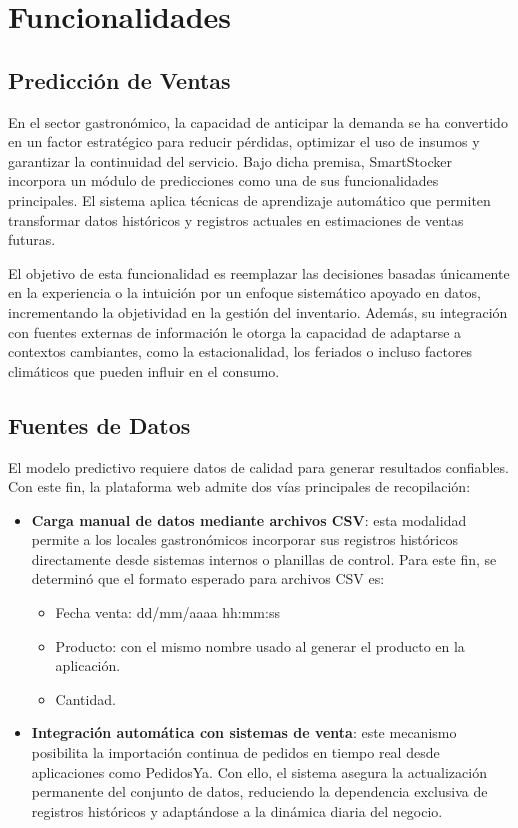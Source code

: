 \section{Funcionalidades}\label{sec:funcionalidades}

\subsection{Predicción de Ventas}\label{sec:prediccion-ventas}

En el sector gastronómico, la capacidad de anticipar la demanda se ha convertido en un factor estratégico para reducir pérdidas, optimizar el uso de insumos y garantizar la continuidad del servicio. Bajo dicha premisa, SmartStocker incorpora un módulo de predicciones como una de sus funcionalidades principales. El sistema aplica técnicas de aprendizaje automático que permiten transformar datos históricos y registros actuales en estimaciones de ventas futuras. 

El objetivo de esta funcionalidad es reemplazar las decisiones basadas únicamente en la experiencia o la intuición por un enfoque sistemático apoyado en datos, incrementando la objetividad en la gestión del inventario. Además, su integración con fuentes externas de información le otorga la capacidad de adaptarse a contextos cambiantes, como la estacionalidad, los feriados o incluso factores climáticos que pueden influir en el consumo.

\subsection{Fuentes de Datos}\label{sec:fuentes-datos}

El modelo predictivo requiere datos de calidad para generar resultados confiables. Con este fin, la plataforma web admite dos vías principales de recopilación:

\begin{itemize}
    \item \textbf{Carga manual de datos mediante archivos CSV}: esta modalidad permite a los locales gastronómicos incorporar sus registros históricos directamente desde sistemas internos o planillas de control. Para este fin, se determinó que el formato esperado para archivos CSV es:
    \begin{itemize}
        \item Fecha venta: dd/mm/aaaa hh:mm:ss
        \item Producto: con el mismo nombre usado al generar el producto en la aplicación.
        \item Cantidad.
    \end{itemize}

    \item \textbf{Integración automática con sistemas de venta}: este mecanismo posibilita la importación continua de pedidos en tiempo real desde aplicaciones como PedidosYa. Con ello, el sistema asegura la actualización permanente del conjunto de datos, reduciendo la dependencia exclusiva de registros históricos y adaptándose a la dinámica diaria del negocio.
\end{itemize}

